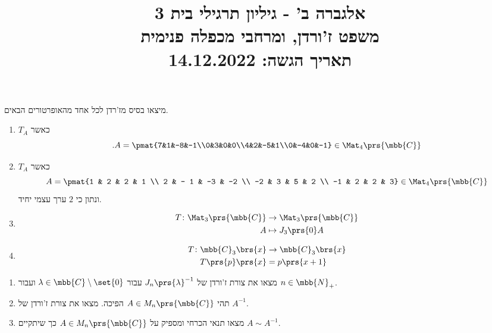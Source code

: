 \documentclass[a4paper,10pt,twoside,openany]{article}
\title{
אלגברה ב' - גיליון תרגילי בית 3 \\
משפט ז'ורדן, ומרחבי מכפלה פנימית
\\
\vspace{1cm}
\large{תאריך הגשה: 14.12.2022}
}
\date{}
\begin{document}
\maketitle

\begin{exercise}%
מיצאו בסיס מז'רדן לכל אחד מהאופרטורים הבאים.

\begin{enumerate}
\item
$T_A$
כאשר
\[\text{.} A = \pmat{7&1&-8&-1\\0&3&0&0\\4&2&-5&1\\0&-4&0&-1} \in \Mat_4\prs{\mbb{C}}\]

\item
$T_A$
כאשר
\[A=\pmat{1 & 2 & 2 & 1 \\ 2 & - 1 & -3 & -2 \\ -2 & 3 & 5 & 2 \\ -1 & 2 & 2 & 3} \in \Mat_4\prs{\mbb{C}}\]
ונתון כי
$2$
ערך עצמי יחיד.

\item
\begin{align*}
T \colon \Mat_3\prs{\mbb{C}} &\to \Mat_3\prs{\mbb{C}} \\
A &\mapsto J_3\prs{0} A
\end{align*}

\item
\begin{align*}
T \colon \mbb{C}_3\brs{x} &\to \mbb{C}_3\brs{x} \\
T\prs{p}\prs{x} &= p\prs{x+1}
\end{align*}
\end{enumerate}
\end{exercise}

\begin{exercise}%
\begin{enumerate}
\item מצאו את צורת ז'ורדן של
$J_n\prs{\lambda}^{-1}$
עבור
$\lambda \in \mbb{C}\setminus\set{0}$
ועבור
$n \in \mbb{N}_+$.

\item תהי
$A \in M_n\prs{\mbb{C}}$
הפיכה.
מצאו את צורת ז'ורדן של
$A^{-1}$.

\item מצאו תנאי הכרחי ומספיק על
$A \in M_n\prs{\mbb{C}}$
כך שיתקיים
$A \sim A^{-1}$.
\end{enumerate}
\end{exercise}
\end{document}
